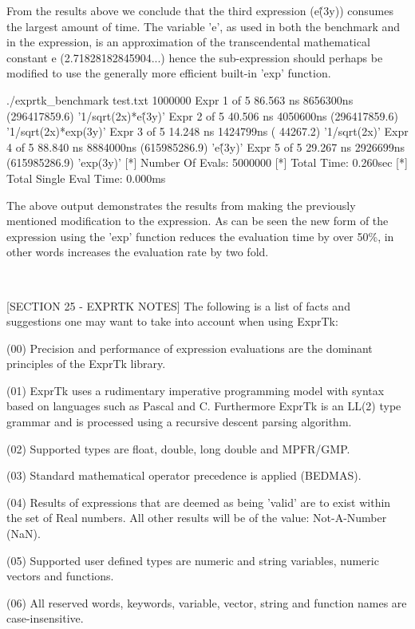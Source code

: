 {From the results above we conclude that the third expression  (e\^(3y))
consumes the largest amount of time. The variable 'e', as used in both
the  benchmark  and  in the  expression,  is  an approximation  of the
transcendental mathematical constant e (2.71828182845904...) hence the
sub-expression  should perhaps be  modified  to use the generally more
efficient built-in 'exp' function.

./exprtk\_benchmark test.txt 1000000
Expr 1 of 5 86.563 ns 8656300ns (296417859.6) '1/sqrt(2x)*e\^(3y)'
Expr 2 of 5 40.506 ns 4050600ns (296417859.6) '1/sqrt(2x)*exp(3y)'
Expr 3 of 5 14.248 ns 1424799ns (    44267.2) '1/sqrt(2x)'
Expr 4 of 5 88.840 ns 8884000ns (615985286.9) 'e\^(3y)'
Expr 5 of 5 29.267 ns 2926699ns (615985286.9) 'exp(3y)'
[*] Number Of Evals:        5000000
[*] Total Time:             0.260sec
[*] Total Single Eval Time: 0.000ms


The above output demonstrates the  results from  making the previously
mentioned modification to the expression. As can be seen the new  form
of the expression using the 'exp' function reduces the evaluation time
by over 50\%, in other words increases the evaluation rate by two fold.

~~~~~~~~~~~~~~~~~~~~~~~~~~~~~~~~~~~~~~~~~~~~~~~~~~~~~~~~~~

[SECTION 25 - EXPRTK NOTES]
The following is a list of facts and suggestions one may want to take
into account when using ExprTk:

(00) Precision  and performance  of expression  evaluations are  the
dominant principles of the ExprTk library.

(01) ExprTk  uses a  rudimentary imperative  programming model  with
syntax based  on languages  such as  Pascal and  C. Furthermore
ExprTk  is  an LL(2)  type  grammar and  is  processed using  a
recursive descent parsing algorithm.

(02) Supported types are float, double, long double and MPFR/GMP.

(03) Standard mathematical operator precedence is applied (BEDMAS).

(04) Results of expressions that are deemed as being 'valid' are  to
exist within the set of Real numbers. All other results will be
of the value: Not-A-Number (NaN).

(05) Supported   user  defined   types   are   numeric  and   string
variables, numeric vectors and functions.

(06) All  reserved words,  keywords, variable,  vector, string   and
function names are case-insensitive.

}

